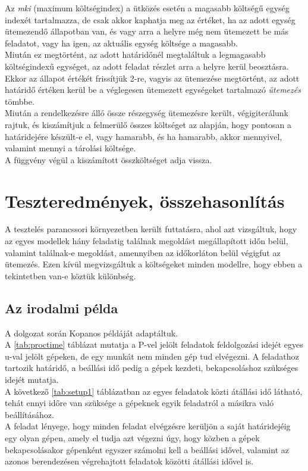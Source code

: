 \documentclass {report}
\begin{document}
Az \emph{mki} (maximum költségindex) a ütközés esetén a magasabb költségű egység indexét tartalmazza, de csak akkor kaphatja meg az értéket, ha az adott egység ütemezendő állapotban van, és vagy arra a helyre még nem ütemezett be más feladatot, vagy ha igen, az aktuális egység költsége a magasabb.\\
Miután ez megtörtént, az adott határidőnél megtaláltuk a legmagasabb költségindexű egységet, az adott feladat részlet arra a helyre kerül beosztásra. Ekkor az állapot értékét frissítjük 2-re, vagyis az ütemezése megtörtént, az adott határidő értéken kerül be a véglegesen ütemezett egységeket tartalmazó \emph{ütemezés} tömbbe. \\
Miután a rendelkezésre álló össze részegység ütemezésre került, végigiterálunk rajtuk, és kiszámítjuk a felmerülő összes költséget az alapján, hogy pontosan a határidejére készült-e el, vagy hamarabb, és ha hamarabb, akkor mennyivel, valamint mennyi a tárolási költsége.\\ A függvény végül a kiszámított összköltséget adja vissza.

\chapter{Teszteredmények, összehasonlítás}
A tesztelés parancssori környezetben került futtatásra, ahol azt vizsgáltuk, hogy az egyes modellek hány feladatig találnak megoldást megállapított időn belül, valamint találnak-e megoldást, amennyiben az időkorláton belül végigfut az ütemezés. Ezen kívül megvizsgáltuk a költségeket minden modellre, hogy ebben a tekintetben van-e köztük különbség. 
\section{Az irodalmi példa}
A dolgozat során Kopanos\cite{Kopanos2009} példáját adaptáltuk.\\
A \ref{tab:proctime} táblázat mutatja a P-vel jelölt feladatok feldolgozási idejét egyes u-val jelölt gépeken, de egy munkát nem minden gép tud elvégezni. A feladathoz tartozik határidő, a beállási idő pedig a gépek kezdeti, bekapcsoláshoz szükséges idejét mutatja.\\
A következő \ref{tab:setup1} táblázatban az egyes feladatok közti átállási idő látható, tehát ennyi időre van szüksége a gépeknek egyik feladatról a másikra való beállításához.\\
A feladat lényege, hogy minden feladat elvégzésre kerüljön a saját határidejéig egy olyan gépen, amely el tudja azt végezni úgy, hogy közben a gépek bekapcsolásakor gépenként egyszer számolni kell a beállási idővel, valamint az azonos berendezésen végrehajtott feladatok közötti átállási idővel is. 
\end{document}
